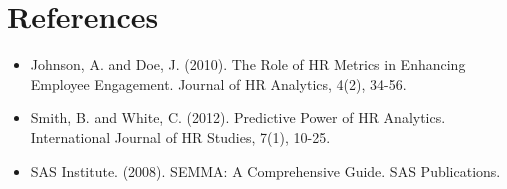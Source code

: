 \documentclass{article}
\begin{document}
\section{References}

\begin{itemize}
    \item Johnson, A. and Doe, J. (2010). The Role of HR Metrics in Enhancing Employee Engagement. Journal of HR Analytics, 4(2), 34-56.
    \item Smith, B. and White, C. (2012). Predictive Power of HR Analytics. International Journal of HR Studies, 7(1), 10-25.
    \item SAS Institute. (2008). SEMMA: A Comprehensive Guide. SAS Publications.
\end{itemize}
\end{document}
